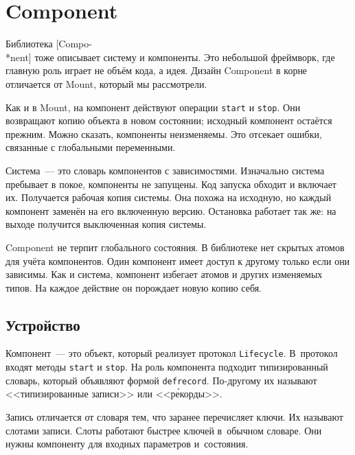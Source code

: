 \ifafive\vspace{10mm}\pagebreak[4]\fi

\section{Component}


Библиотека [Compo-\\*nent] тоже
описывает систему и компоненты. Это небольшой фреймворк, где главную роль играет
не объём кода, а идея. Дизайн Component в корне отличается от Mount, который мы
рассмотрели.


Как и в Mount, на компонент действуют операции \verb|start| и \verb|stop|. Они
возвращают копию объекта в новом состоянии; исходный компонент остаётся
прежним. Можно сказать, компоненты неизменяемы. Это отсекает ошибки, связанные с
глобальными переменными.

Система~--- это словарь компонентов с зависимостями. Изначально система
пребывает в покое, компоненты не запущены. Код запуска обходит и включает
их. Получается рабочая копия системы. Она похожа на исходную, но каждый
компонент заменён на его включенную версию. Остановка работает так же: на выходе
получится выключенная копия системы.

Component не терпит глобального состояния. В библиотеке нет скрытых атомов для
учёта компонентов. Один компонент имеет доступ к другому только если они
зависимы. Как и система, компонент избегает атомов и других изменяемых типов. На
каждое действие он порождает новую копию себя.

\subsection{Устройство}

\label{defrecord}

Компонент~--- это объект, который реализует протокол \verb|Lifecycle|. В~протокол
входят методы \verb|start| и \verb|stop|. На роль компонента подходит
типизированный словарь, который объявляют формой \verb|defrecord|. По-другому их
называют <<типизированные записи>> или <<р\'{е}корды>>.


Запись отличается от словаря тем, что заранее перечисляет ключи. Их называют
слотами записи. Слоты работают быстрее ключей в~обычном словаре. Они нужны
компоненту для входных параметров и~состояния.

